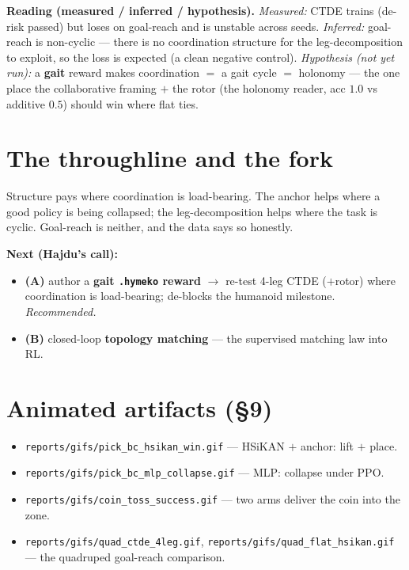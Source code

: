 \documentclass[11pt]{article}
\newcommand{\gif}[1]{\texttt{\small reports/gifs/#1}}
\begin{document}
\noindent\textbf{Reading (measured / inferred / hypothesis).} \emph{Measured:} CTDE trains (de-risk passed) but
loses on goal-reach and is unstable across seeds. \emph{Inferred:} goal-reach is non-cyclic --- there is no
coordination structure for the leg-decomposition to exploit, so the loss is expected (a clean negative control).
\emph{Hypothesis (not yet run):} a \textbf{gait} reward makes coordination $=$ a gait cycle $=$ holonomy --- the
one place the collaborative framing $+$ the rotor (the holonomy reader, acc $1.0$ vs additive $0.5$) should win
where flat ties.

\section{The throughline and the fork}
Structure pays where coordination is load-bearing. The anchor helps where a good policy is being collapsed; the
leg-decomposition helps where the task is cyclic. Goal-reach is neither, and the data says so honestly.

\medskip\noindent\textbf{Next (Hajdu's call):}
\begin{itemize}[topsep=2pt,itemsep=1pt]
  \item \textbf{(A)} author a \textbf{gait \texttt{.hymeko} reward} $\to$ re-test 4-leg CTDE ($+$rotor) where
    coordination is load-bearing; de-blocks the humanoid milestone. \emph{Recommended.}
  \item \textbf{(B)} closed-loop \textbf{topology matching} --- the supervised matching law into RL.
\end{itemize}

\section*{Animated artifacts (\S9)}
\begin{itemize}[topsep=2pt,itemsep=0pt]
  \item \gif{pick\_bc\_hsikan\_win.gif} --- HSiKAN $+$ anchor: lift $+$ place.
  \item \gif{pick\_bc\_mlp\_collapse.gif} --- MLP: collapse under PPO.
  \item \gif{coin\_toss\_success.gif} --- two arms deliver the coin into the zone.
  \item \gif{quad\_ctde\_4leg.gif}, \gif{quad\_flat\_hsikan.gif} --- the quadruped goal-reach comparison.
\end{itemize}
\end{document}
